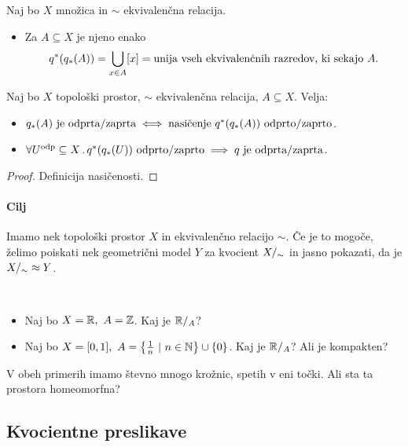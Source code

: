 \newpage
\begin{definicija}
    Naj bo \(X\) množica in \(\sim\) ekvivalenčna relacija. 
    \begin{itemize}
        \item Za \(A \subseteq X\) je njeno  enako \[q^{*}(q_{*}(A)) = \bigcup_{x \in A} [x] = \text{unija vseh ekvivalenčnih razredov, ki sekajo} \ A.\]
    \end{itemize}
\end{definicija}

\begin{trditev}
    Naj bo \(X\) topološki prostor, \(\sim\) ekvivalenčna relacija, \(A \subseteq X\). Velja:
    \begin{itemize}
        \item \(\img{q}(A) \ \text{je odprta/zaprta} \liff  \text{nasičenje} \ \invimg{q}(\img{q}(A)) \ \text{odprto/zaprto}\). 
        \item \(\forall U^{\text{odp}} \subseteq X \,.\, q^{*}(q_{*}(U)) \ \text{odprto/zaprto} \implies q \ \text{je odprta/zaprta}\).
    \end{itemize}
\end{trditev}

\begin{proof}
    Definicija nasičenosti.
\end{proof}

\paragraph{Cilj} Imamo nek topološki prostor \(X\) in ekvivalenčno relacijo \(\sim\). Če je to mogoče, želimo poiskati nek geometrični model \(Y\) za kvocient \({X/_\sim}\) in jasno pokazati, da je \({X/_\sim} \approx Y\).

\begin{primer}
    \
    \begin{itemize}
        \item Naj bo \(X = \mathbb{R}, \ A = \mathbb{Z}\). Kaj je \(\mathbb{R}/_{A}\)?
        \item Naj bo \(X = [0,1], \ A = \left\{\frac{1}{n} \ | \ n \in \mathbb{N}\right\} \cup \left\{0\right\}\). Kaj je \(\mathbb{R}/_{A}\)? Ali je kompakten?
    \end{itemize}
    V obeh primerih imamo števno mnogo krožnic, spetih v eni točki. Ali sta ta prostora homeomorfna?
\end{primer}

\subsection{Kvocientne preslikave}
